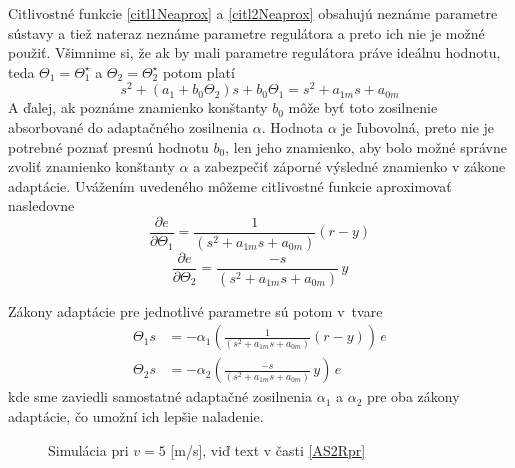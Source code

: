 \documentclass[a4paper, 10pt, ]{article}
\begin{document}
Citlivostné funkcie \eqref{citl1Neaprox} a \eqref{citl2Neaprox} obsahujú neznáme parametre sústavy a tiež nateraz neznáme parametre regulátora a preto ich nie je možné použiť. Všimnime si, že ak by mali parametre regulátora práve ideálnu hodnotu, teda ${\Theta}_1 = {\Theta}_1^\star$ a ${\Theta}_2 = {\Theta}_2^\star$ potom platí
\begin{equation}
	s^2 + \left( a_1 + b_0 \Theta_2 \right) s + b_0 \Theta_1 = s^2 + a_{1m} s + a_{0m}
\end{equation}
A ďalej, ak poznáme znamienko konštanty $b_0$ môže byť toto zosilnenie absorbované do adaptačného zosilnenia $\alpha$. Hodnota $\alpha$ je ľubovolná, preto nie je potrebné poznať presnú hodnotu $b_0$, len jeho znamienko, aby bolo možné správne zvoliť znamienko konštanty $\alpha$ a zabezpečiť záporné výsledné znamienko v zákone adaptácie.  Uvážením uvedeného môžeme citlivostné funkcie aproximovať nasledovne
\begin{equation} \label{citl1Aprox}
	\frac{\partial e}{\partial \Theta_1} = \frac{1}{ \left( s^2 + a_{1m} s + a_{0m} \right) } \left( r - y \right)
\end{equation}
\begin{equation} \label{citl2Aprox}
	\frac{\partial e}{\partial \Theta_2} = \frac{-s} { \left( s^2 + a_{1m} s + a_{0m} \right) } \,	y
\end{equation}

Zákony adaptácie pre jednotlivé parametre sú potom v~tvare
\begin{align}
	\Theta_1 s &= - \alpha_1 \left( \frac{1}{ \left( s^2 + a_{1m} s + a_{0m} \right) } \left( r - y \right) \right) \, e \\
	\Theta_2 s &= - \alpha_2 \left( \frac{-s}{ \left( s^2 + a_{1m} s + a_{0m} \right)} \, y \right) \, e
\end{align}
kde sme zaviedli samostatné adaptačné zosilnenia $\alpha_1$ a $\alpha_2$ pre oba zákony adaptácie, čo umožní ich lepšie naladenie.







\begin{figure}[t]
	\centering



	\caption{Simulácia pri $v = 5$ [m/s], viď text v časti \ref{AS2Rpr}}
	\label{fig_tex_03_1}

\end{figure}
\end{document}
